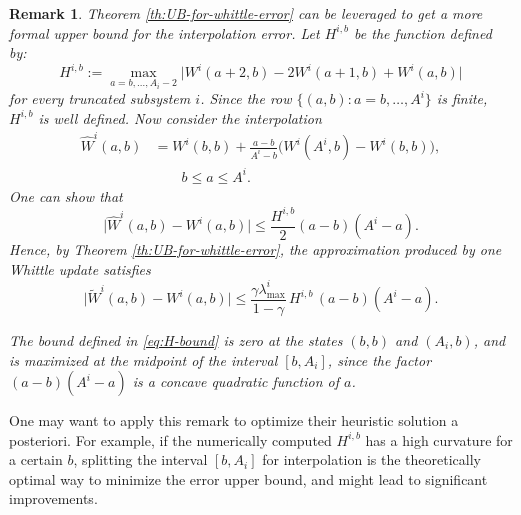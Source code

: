 \documentclass[letterpaper,journal]{IEEEtran}
\newtheorem*{remark}{Remark}
\begin{document}
\begin{remark}

Theorem \ref{th:UB-for-whittle-error} can be leveraged to get a more formal upper bound for the interpolation error. Let $H^{i,b}$ be the function defined by:
\[
H^{i,b}:=\max_{a=b,\dots,A_i-2}\bigl|W^i(a+2,b)-2W^i(a+1,b)+W^i(a,b)\bigr|
\]
for every truncated subsystem $i$. Since the row $\{(a,b):a=b,\dots,A^i\}$ is finite, $H^{i,b}$ is well defined.
Now consider the interpolation
\[
\begin{aligned}
\widehat W^i(a,b)&=W^i(b,b)+\frac{a-b}{A^i-b}
\bigl(W^i(A^i,b)-W^i(b,b)\bigr),\\
&\hspace{2em} b\leq a\leq A^i.
\end{aligned}
\]
One can show that
\[\bigl|\widehat W^i(a,b)-W^i(a,b)\bigr|\leq\frac{H^{i,b}}{2}(a-b)(A^i-a).
\]
Hence, by Theorem \ref{th:UB-for-whittle-error}, the approximation produced by one Whittle update satisfies
\begin{equation}\label{eq:H-bound}
\bigl|\widetilde{W}^i(a,b)-W^i(a,b)\bigr|\leq\frac{\gamma\lambda^i_{\max}}{1-\gamma}
\,H^{i,b}\,(a-b)(A^i-a).
\end{equation}

The bound defined in \eqref{eq:H-bound} is zero at the states $(b,b)$ and $(A_i,b)$, and is maximized at the midpoint of the interval $[b, A_i]$, since the factor $(a-b)(A^i-a)$ is a concave quadratic function of $a$.

\end{remark}

One may want to apply this remark to optimize their heuristic solution a posteriori. For example, if the numerically computed $H^{i,b}$ has a high curvature for a certain $b$, splitting the interval $[b, A_i]$ for interpolation is the theoretically optimal way to minimize the error upper bound, and might lead to significant improvements.
\end{document}
